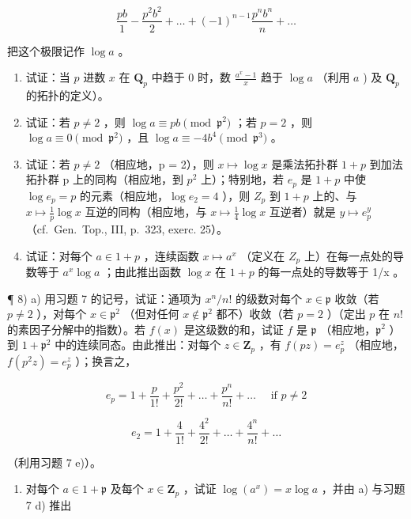 \[
\frac {p b}{1} - \frac {p ^ {2} b ^ {2}}{2} + \dots + (- 1) ^ {n - 1} \frac {p ^ {n} b ^ {n}}{n} + \dots
\]

把这个极限记作 \(\log a\) 。

\begin{enumerate}
\def\labelenumi{\alph{enumi})}
\setcounter{enumi}{1}
\item
  试证：当 \(p\) 进数 \(x\) 在 \(\mathbf{Q}_p\) 中趋于 0 时，数 \(\frac{a^x - 1}{x}\) 趋于 \(\log a\) （利用 \(a\) ) 及 \(\mathbf{Q}_p\) 的拓扑的定义）。
\item
  试证：若 \(p \neq 2\) ，则 \(\log a \equiv pb \pmod{\mathfrak{p}^2}\) ；若 \(p = 2\) ，则 \(\log a \equiv 0 \pmod{\mathfrak{p}^2}\) ，且 \(\log a \equiv -4b^4 \pmod{\mathfrak{p}^3}\) 。
\item
  试证：若 \(p \neq 2\) （相应地，p = 2），则 \(x \mapsto \log x\) 是乘法拓扑群 \(1 + p\) 到加法拓扑群 p 上的同构（相应地，到 \(p^{2}\) 上）；特别地，若 \(e_{p}\) 是 \(1 + p\) 中使 \(\log e_{p} = p\) 的元素（相应地，\(\log e_{2} = 4\) ），则 \(Z_{p}\) 到 \(1 + p\) 上的、与 \(x \mapsto \frac{1}{p} \log x\) 互逆的同构（相应地，与 \(x \mapsto \frac{1}{4} \log x\) 互逆者）就是 \(y \mapsto e_{p}^{y}\) （cf.~Gen.~Top., III, p.~323, exerc. 25）。
\item
  试证：对每个 \(a \in 1 + p\) ，连续函数 \(x \mapsto a^{x}\) （定义在 \(Z_{p}\) 上）在每一点处的导数等于 \(a^{x} \log a\) ；由此推出函数 \(\log x\) 在 \(1 + p\) 的每一点处的导数等于 1/x 。
\end{enumerate}

¶ 8) a) 用习题 7 的记号，试证：通项为 \(x^n / n!\) 的级数对每个 \(x \in \mathfrak{p}\) 收敛（若 \(p \neq 2\) ），对每个 \(x \in \mathfrak{p}^2\) （但对任何 \(x \notin \mathfrak{p}^2\) 都不）收敛（若 \(p = 2\) ）（定出 \(p\) 在 \(n!\) 的素因子分解中的指数）。若 \(f(x)\) 是这级数的和，试证 \(f\) 是 \(\mathfrak{p}\) （相应地，\(\mathfrak{p}^2\) ）到 \(1 + \mathfrak{p}^2\) 中的连续同态。由此推出：对每个 \(z \in \mathbf{Z}_p\) ，有 \(f(pz) = e_p^z\) （相应地，\(f(p^2z) = e_p^z\) ）；换言之，

\[
e _ {p} = 1 + \frac {p}{1 !} + \frac {p ^ {2}}{2 !} + \dots + \frac {p ^ {n}}{n !} + \dots \quad \text { if } p \neq 2
\]

\[
e _ {2} = 1 + \frac {4}{1 !} + \frac {4 ^ {2}}{2 !} + \dots + \frac {4 ^ {n}}{n !} + \dots
\]

（利用习题 7 e)）。

\begin{enumerate}
\def\labelenumi{\alph{enumi})}
\setcounter{enumi}{1}
\tightlist
\item
  对每个 \(a \in 1 + \mathfrak{p}\) 及每个 \(x \in \mathbf{Z}_p\) ，试证 \(\log (a^x) = x\log a\) ，并由 a) 与习题 7 d) 推出
\end{enumerate}

